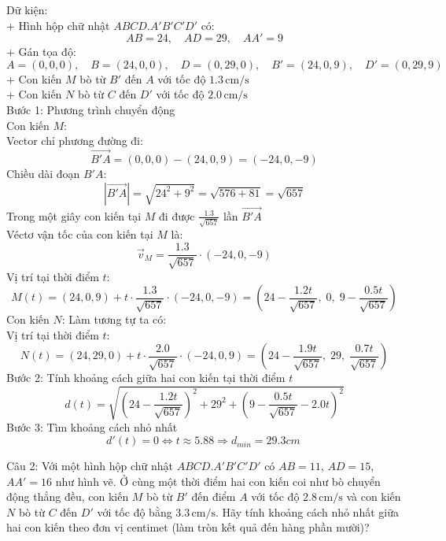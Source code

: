 \documentclass[a4paper,12pt]{article}
\begin{document}
Dữ kiện:\\
+ Hình hộp chữ nhật \(ABCD.A'B'C'D'\) có:\\
\[
AB = 24,\quad AD = 29,\quad AA' = 9
\]
+ Gán tọa độ:
\[
A = (0, 0, 0),\quad B = (24, 0, 0),\quad D = (0, 29, 0),\quad B' = (24, 0, 9),\quad D' = (0, 29, 9)
\]
+ Con kiến \(M\) bò từ \(B'\) đến \(A\) với tốc độ \(1.3\, \text{cm/s}\)\\
+ Con kiến \(N\) bò từ \(C\) đến \(D'\) với tốc độ \(2.0\, \text{cm/s}\)\\
Bước 1: Phương trình chuyển động\\
Con kiến \(M\):\\
Vector chỉ phương đường đi:
\[
\overrightarrow{B'A} = (0, 0, 0) - (24, 0, 9) = ( -24, 0, -9 )
\]
Chiều dài đoạn \(B'A\):
\[
|\overrightarrow{B'A}| = \sqrt{24^2 + 9^2} = \sqrt{576 + 81} = \sqrt{657}
\]
Trong một giây con kiến tại \(M\) đi được \(\frac{1.3}{\sqrt{657}}\) lần \(\overrightarrow{B'A}\)\\
Véctơ vận tốc của con kiến tại \(M\) là:
\[
\overrightarrow{v}_M = \frac{1.3}{\sqrt{657}} \cdot ( -24, 0, -9 )
\]
Vị trí tại thời điểm \(t\):
\[
M(t) = (24, 0, 9) + t \cdot \frac{1.3}{\sqrt{657}} \cdot ( -24, 0, -9 )
= \left( 24 - \frac{1.2t}{\sqrt{657}},\; 0,\; 9 - \frac{0.5t}{\sqrt{657}} \right)
\]
Con kiến \(N\): Làm tương tự ta có:\\
Vị trí tại thời điểm \(t\):
\[
N(t) = (24, 29, 0) + t \cdot \frac{2.0}{\sqrt{657}} \cdot (-24, 0, 9)
= \left( 24 - \frac{1.9t}{\sqrt{657}},\; 29,\; \frac{0.7t}{\sqrt{657}} \right)
\]
Bước 2: Tính khoảng cách giữa hai con kiến tại thời điểm \(t\)
\[
d(t) = \sqrt{\left(24 - \frac{1.2t}{\sqrt{657}}\right)^2 + 29^2 + \left(9 - \frac{0.5t}{\sqrt{657}} - 2.0t\right)^2}
\]
Bước 3: Tìm khoảng cách nhỏ nhất
\[
d'(t)=0\Leftrightarrow t \approx 5.88 \Rightarrow d_{min}=29.3cm\
\]




Câu 2: 
Với một hình hộp chữ nhật \(ABCD.A'B'C'D'\) có \(AB=11\), \(AD=15\), \(AA'=16\) như hình vẽ. Ở cùng một thời điểm hai con kiến coi như bò chuyển động thẳng đều, con kiến \(M\) bò từ \(B'\) đến điểm \(A\) với tốc độ \(2.8\,\mathrm{cm/s}\) và con kiến \(N\) bò từ \(C\) đến \(D'\) với tốc độ bằng \(3.3\,\mathrm{cm/s}\). Hãy tính khoảng cách nhỏ nhất giữa hai con kiến theo đơn vị centimet (làm tròn kết quả đến hàng phần mười)?
\end{document}
